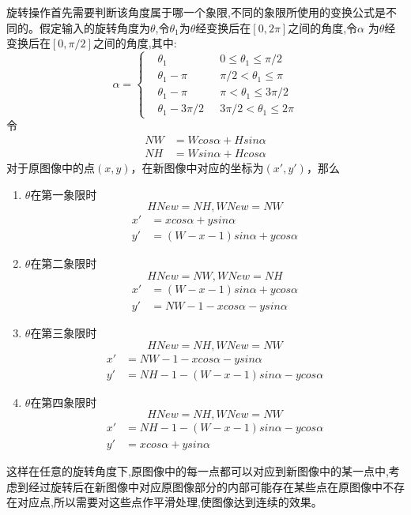 \documentclass{XDBAthesis}
\begin{document}
旋转操作首先需要判断该角度属于哪一个象限,不同的象限所使用的变换公式是不同的。假定输入的旋转角度为$\theta $,令$\theta_1 $为$\theta$经变换后在$[0,2\pi ]$之间的角度,令$\alpha $ 为$\theta $经变换后在$[0,\pi /2 ]$之间的角度,其中:
$$
\alpha =\left\{ 
    \begin{aligned}
       & \theta_1 &0 \leq \theta_1 \leq \pi /2 \\
       & \theta_1 -\pi &\pi /2 < \theta_1 \leq \pi\\
       & \theta_1 -\pi &\pi < \theta_1 \leq 3\pi /2\\
       & \theta_1 -3\pi /2 \ \ \ &3\pi /2 <\theta_1 \leq 2\pi 
    \end{aligned}
\right.
$$
令
$$
\begin{aligned}
NW&=Wcos\alpha +Hsin\alpha \\
NH&=Wsin\alpha +Hcos\alpha 
\end{aligned}
$$
对于原图像中的点$(x,y)$，在新图像中对应的坐标为$(x',y')$，那么
\begin{enumerate}
    \item $\theta $在第一象限时$$HNew=NH,WNew=NW$$
    $$
    \begin{aligned}
      x'&=xcos\alpha +ysin\alpha\\
      y'&=(W-x-1)sin\alpha +ycos\alpha
    \end{aligned}
    $$
    \item $\theta $在第二象限时$$HNew=NW,WNew=NH$$
    $$
    \begin{aligned}
      x'&=(W-x-1)sin\alpha +ycos\alpha\\
      y'&=NW-1-xcos\alpha -ysin\alpha
    \end{aligned}
    $$
    \item $\theta $在第三象限时$$HNew=NH,WNew=NW$$
     $$
    \begin{aligned}
      x'&=NW-1-xcos\alpha -ysin\alpha\\
      y'&=NH-1-(W-x-1)sin\alpha -ycos\alpha
    \end{aligned}
    $$
    \item $\theta $在第四象限时$$HNew=NH,WNew=NW$$
     $$
    \begin{aligned}
      x'&=NH-1-(W-x-1)sin\alpha -ycos\alpha\\
      y'&=xcos\alpha +ysin\alpha
    \end{aligned}
    $$
\end{enumerate}
这样在任意的旋转角度下,原图像中的每一点都可以对应到新图像中的某一点中,考虑到经过旋转后在新图像中对应原图像部分的内部可能存在某些点在原图像中不存在对应点,所以需要对这些点作平滑处理,使图像达到连续的效果。
\end{document}
